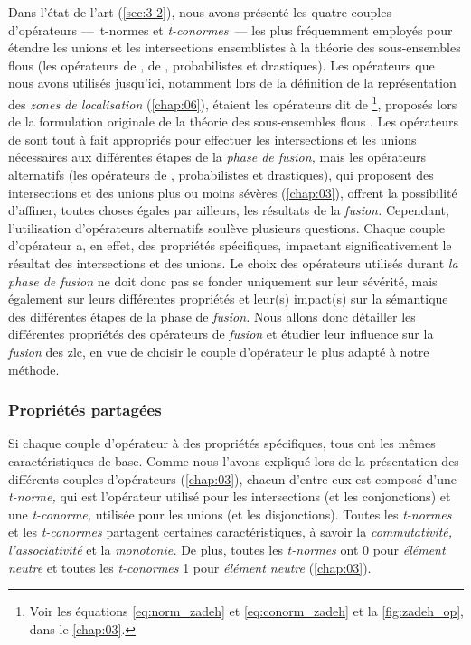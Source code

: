 Dans l'état de l'art (\autoref{sec:3-2}), nous avons présenté les
quatre couples d'opérateurs ---~t-normes et \emph{t-conormes}~--- les
plus fréquemment employés pour étendre les unions et les intersections
ensemblistes à la théorie des sous-ensembles flous (\ie les opérateurs
de \textcite{Zadeh1965}, de , probabilistes et
drastiques). Les opérateurs que nous avons utilisés jusqu'ici,
notamment lors de la définition de la représentation des \emph{zones
  de localisation} (\autoref{chap:06}), étaient les opérateurs dit de
 \footnote{Voir les équations \ref{eq:norm_zadeh} et
  \ref{eq:conorm_zadeh} et la \autoref{fig:zadeh_op}, dans le
  \autoref{chap:03}.}, proposés lors de la formulation originale de la
théorie des sous-ensembles flous \autocite{Zadeh1965}. Les opérateurs
de  sont tout à fait appropriés pour effectuer les
intersections et les unions nécessaires aux différentes étapes de la
\emph{phase de fusion,} mais les opérateurs alternatifs (\ie les
opérateurs de , probabilistes et drastiques), qui
proposent des intersections et des unions plus ou moins sévères
(\autoref{chap:03}), offrent la possibilité d'affiner, toutes choses
égales par ailleurs, les résultats de la \emph{fusion.} Cependant,
l'utilisation d'opérateurs alternatifs soulève plusieurs
questions. Chaque couple d'opérateur a, en effet, des propriétés
spécifiques, impactant significativement le résultat des intersections
et des unions. Le choix des opérateurs utilisés durant \emph{la phase
  de fusion} ne doit donc pas se fonder uniquement sur leur sévérité,
mais également sur leurs différentes propriétés et leur(s) impact(s)
sur la sémantique des différentes étapes de la phase de \emph{fusion.}
Nous allons donc détailler les différentes propriétés des opérateurs
de \emph{fusion} et étudier leur influence sur la \emph{fusion} des
\ac{zlc}, en vue de choisir le couple d'opérateur le plus adapté à
notre méthode.

\subsubsection{Propriétés partagées}

Si chaque couple d'opérateur à des propriétés spécifiques, tous ont
les mêmes caractéristiques de base. Comme nous l'avons expliqué lors
de la présentation des différents couples d'opérateurs
(\autoref{chap:03}), chacun d'entre eux est composé d'une
\emph{t-norme,} qui est l'opérateur utilisé pour les intersections (et
les conjonctions) et une \emph{t-conorme,} utilisée pour les unions
(et les disjonctions). Toutes les \emph{t-normes} et les
\emph{t-conormes} partagent certaines caractéristiques, à savoir la
\emph{commutativité,} \emph{l'associativité} et la \emph{monotonie.}
De plus, toutes les \emph{t-normes} ont 0 pour \emph{élément neutre}
et toutes les \emph{t-conormes} 1 pour \emph{élément neutre} (\autoref{chap:03}).


